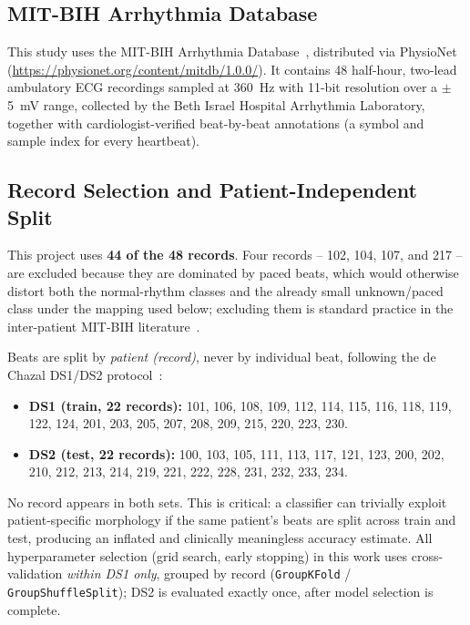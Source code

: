 \documentclass[conference]{IEEEtran}
\begin{document}
\subsection{MIT-BIH Arrhythmia Database}

This study uses the MIT-BIH Arrhythmia
Database~\cite{moody2001impact,goldberger2000physiobank}, distributed via
PhysioNet (\url{https://physionet.org/content/mitdb/1.0.0/}). It contains
48 half-hour, two-lead ambulatory ECG recordings sampled at 360~Hz with
11-bit resolution over a $\pm$5~mV range, collected by the Beth Israel
Hospital Arrhythmia Laboratory, together with cardiologist-verified
beat-by-beat annotations (a symbol and sample index for every heartbeat).

\subsection{Record Selection and Patient-Independent Split}

This project uses \textbf{44 of the 48 records}. Four records --
102, 104, 107, and 217 -- are excluded because they are dominated by
paced beats, which would otherwise distort both the normal-rhythm classes
and the already small unknown/paced class under the mapping used below;
excluding them is standard practice in the inter-patient MIT-BIH
literature~\cite{dechazal2004automatic}.

Beats are split by \emph{patient (record)}, never by individual beat,
following the de Chazal DS1/DS2
protocol~\cite{dechazal2004automatic}:
\begin{itemize}
\item \textbf{DS1 (train, 22 records):} 101, 106, 108, 109, 112, 114, 115,
  116, 118, 119, 122, 124, 201, 203, 205, 207, 208, 209, 215, 220, 223, 230.
\item \textbf{DS2 (test, 22 records):} 100, 103, 105, 111, 113, 117, 121,
  123, 200, 202, 210, 212, 213, 214, 219, 221, 222, 228, 231, 232, 233, 234.
\end{itemize}
No record appears in both sets. This is critical: a classifier can
trivially exploit patient-specific morphology if the same patient's beats
are split across train and test, producing an inflated and clinically
meaningless accuracy estimate. All hyperparameter selection (grid search,
early stopping) in this work uses cross-validation \emph{within DS1 only},
grouped by record (\texttt{GroupKFold} / \texttt{GroupShuffleSplit}); DS2
is evaluated exactly once, after model selection is complete.
\end{document}
